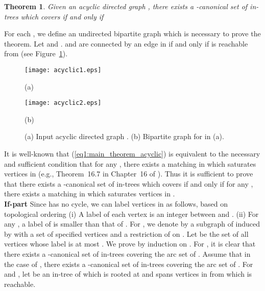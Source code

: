 \documentclass[11pt]{article}
\newcounter{ni}
\theoremstyle{plain}
\newtheorem{theorem}{Theorem}[section]
\newcommand{\eop}{\hfill \usebox{\ProofSym}}
\newenvironment{proof}{\noindent {\it Proof.}}{\eop\par\vspace{0.3cm}}
\begin{document}
\begin{theorem} \label{main_theorem_acyclic}
Given an acyclic directed graph  , 
there exists a -canonical set of in-trees which covers 
 if and only if 

\end{theorem}
\begin{proof}
For each , we define an undirected bipartite graph
 which is necessary to prove the theorem. 
Let  and 
. 
 and  are connected by an edge in  if and only if 
is reachable from  (see Figure~\ref{fig:acyclic}). 

\begin{figure}[h]
\begin{minipage}{0.5\hsize}
\begin{center}
\texttt{[image: acyclic1.eps]}
\par(a)
\end{center}
\end{minipage}
\begin{minipage}{0.5\hsize}
\begin{center}
\texttt{[image: acyclic2.eps]}
\par(b)
\end{center}
\end{minipage}
\caption{\small (a) Input acyclic directed graph . (b) Bipartite graph 
 for  in (a).}
\label{fig:acyclic}
\end{figure}

It is well-known that (\ref{eq1:main_theorem_acyclic}) is equivalent to the necessary and
 sufficient condition that for any , there exists a matching
 in  which saturates vertices in  (e.g., Theorem~16.7 in Chapter~16 of \cite{S03}). 
Thus it is
 sufficient to prove that there exists a -canonical set of in-trees which
 covers  if and only if for any , there exists a matching
 in  which saturates vertices in . \\
{\bf If-part}
Since  has no cycle, we can label vertices in  as follows, based on 
topological ordering 
(i) A label of each vertex is an integer between  and .
(ii) For any , a label of  is smaller than that of .  
For , we denote by  a subgraph of 
 induced by  with a set of 
specified vertices  and a restriction of  on . 
Let  be the set of all vertices whose label is at most
. We prove by induction on . For , 
it is clear that there exists a -canonical 
set of in-trees covering the arc set of . 
Assume that in the case of , there exists a -canonical set  
of in-trees covering the arc set of . 
For  and , 
let  be an in-tree of  
which is rooted at  and spans vertices in  from which  is reachable. 


\end{proof}
\end{document}
